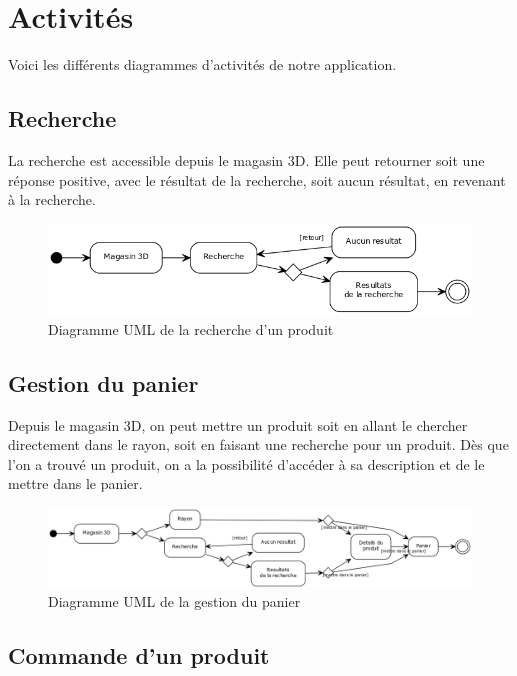 \documentclass[12pt]{article}
\begin{document}
\newpage
\section{Activités}

Voici les différents diagrammes d'activités de notre application.

\subsection{Recherche}

La recherche est accessible depuis le magasin 3D. Elle peut retourner soit une réponse positive,
avec le résultat de la recherche, soit aucun résultat, en revenant à la recherche.

\begin{figure}[ht]
    \center
    \includegraphics[scale=0.6]{../Diagrams/ActivityDiagrams/recherche.png}
    \caption*{Diagramme UML de la recherche d'un produit}
\end{figure}

\subsection{Gestion du panier}

Depuis le magasin 3D, on peut mettre un produit soit en allant le chercher directement dans le rayon,
soit en faisant une recherche pour un produit. Dès que l'on a trouvé un produit, on a la possibilité d'accéder
à sa description et de le mettre dans le panier.

\begin{figure}[ht]
    \center
    \includegraphics[scale=0.4]{../Diagrams/ActivityDiagrams/panier.png}
    \caption*{Diagramme UML de la gestion du panier}
\end{figure}

\subsection{Commande d'un produit}
\end{document}
